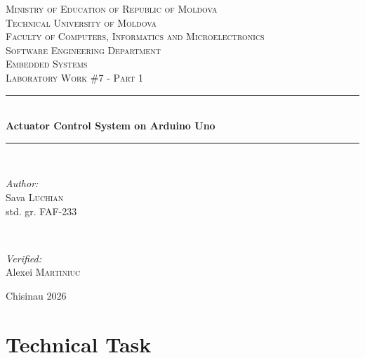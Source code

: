 \documentclass[12pt]{article}
\begin{document}
\begin{titlepage}
  \begin{center}
    \textsc{\large Ministry of Education of Republic of Moldova}\\[0.5cm]
    \textsc{\large Technical University of Moldova}\\[0.5cm]
    \textsc{\large Faculty of Computers, Informatics and Microelectronics}\\[0.5cm]
    \textsc{\large Software Engineering Department}\\[1.2cm]

    \vspace{20mm}
    \textsc{\Large Embedded Systems}\\[0.5cm]
    \textsc{\large Laboratory Work \#7 - Part 1}\\[0.5cm]

    \newcommand{\HRule}{\rule{\linewidth}{0.5mm}}
    \vspace{8mm}
    \HRule\\[0.4cm]
    {\LARGE \bfseries Actuator Control System on Arduino Uno\\[0.3cm]}
    \HRule\\[1.5cm]

    \begin{minipage}[t]{0.45\textwidth}
      \begin{flushleft}\large
        \emph{Author:}\\
        Sava \textsc{Luchian}\\
        std. gr. FAF-233
      \end{flushleft}
    \end{minipage}
    ~
    \begin{minipage}[t]{0.45\textwidth}
      \begin{flushright}\large
        \emph{Verified:}\\
        Alexei \textsc{Martiniuc}
      \end{flushright}
    \end{minipage}

    \vspace*{\fill}
    \large Chisinau 2026
  \end{center}
\end{titlepage}

\setcounter{page}{2}
\pagestyle{fancy}
\fancyhf{}
\rhead{\thepage}

\section*{Technical Task}
\end{document}
